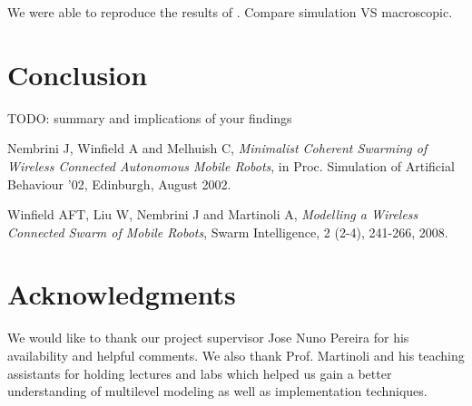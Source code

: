 \documentclass[a4paper, 10pt, conference]{ieeeconf}
\begin{document}
  We were able to reproduce the results of \cite{Winfield08}. Compare simulation VS macroscopic.


\section{Conclusion}
  TODO: summary and implications of your findings




\begin{thebibliography}{99}

   Nembrini J, Winfield A and Melhuish C, \textit{Minimalist Coherent Swarming of Wireless Connected Autonomous Mobile Robots}, in Proc. Simulation of Artificial Behaviour '02, Edinburgh, August 2002.

   Winfield AFT, Liu W, Nembrini J and Martinoli A, \textit{Modelling a Wireless Connected Swarm of Mobile Robots}, Swarm Intelligence, 2 (2-4), 241-266, 2008.

\end{thebibliography}

\section*{Acknowledgments}
  We would like to thank our project supervisor Jose Nuno Pereira for his availability and helpful comments. We also thank Prof. Martinoli and his teaching assistants for holding lectures and labs which helped us gain a better understanding of multilevel modeling as well as implementation techniques.
\end{document}
